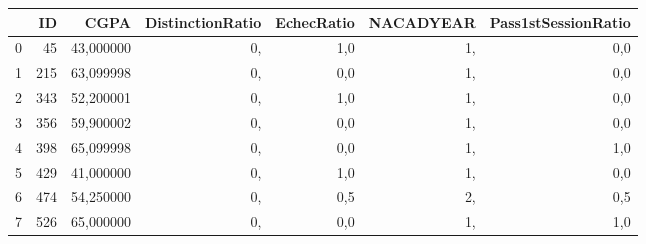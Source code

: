 \begin{tabular}{lrrrrrr}
\toprule
{} &   ID &       CGPA &  DistinctionRatio &  EchecRatio &  NACADYEAR &  Pass1stSessionRatio \\
\midrule
0 &   45 &  43,000000 &                0, &         1,0 &         1, &                  0,0 \\
1 &  215 &  63,099998 &                0, &         0,0 &         1, &                  0,0 \\
2 &  343 &  52,200001 &                0, &         1,0 &         1, &                  0,0 \\
3 &  356 &  59,900002 &                0, &         0,0 &         1, &                  0,0 \\
4 &  398 &  65,099998 &                0, &         0,0 &         1, &                  1,0 \\
5 &  429 &  41,000000 &                0, &         1,0 &         1, &                  0,0 \\
6 &  474 &  54,250000 &                0, &         0,5 &         2, &                  0,5 \\
7 &  526 &  65,000000 &                0, &         0,0 &         1, &                  1,0 \\
\bottomrule
\end{tabular}
